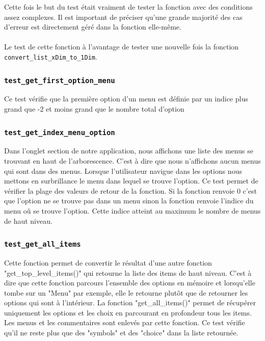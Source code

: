 \documentclass[16pts]{report}
\begin{document}
Cette fois le but du test était vraiment de tester la fonction avec des 
conditions assez complexes. Il est important de préciser qu'une grande 
majorité des cas d'erreur est directement géré dans la fonction elle-même.\\
\\

Le test de cette fonction à l'avantage de tester une nouvelle fois la 
fonction \verb|convert_list_xDim_to_1Dim|.\\

\subsubsection{\texttt{test\_get\_first\_option\_menu}}

Ce test vérifie que la première option d'un menu est définie par un indice
plus grand que -2 et moins grand que le nombre total d'option\\

\subsubsection{\texttt{test\_get\_index\_menu\_option}}

Dans l'onglet section de notre application, nous affichons une liste des 
menus se trouvant en haut de l'arborescence. C'est à dire que nous n'affichons 
aucun menus qui sont dans des menus. Lorsque l'utilisateur navigue dans les 
options nous mettons en surbrillance le menu dans lequel se trouve l'option. 
Ce test permet de vérifier la plage des valeurs de retour de la fonction. 
Si la fonction renvoie 0 c'est que l'option ne se trouve pas dans un menu 
sinon la fonction renvoie l'indice du menu oû se trouve l'option. Cette 
indice atteint au maximum le nombre de menus de haut niveau.

\subsubsection{\texttt{test\_get\_all\_items}}

Cette fonction permet de convertir le résultat d'une autre fonction 
"get\_top\_level\_items()" qui retourne la liste des items de haut niveau. 
C'est à dire que cette fonction parcours l'ensemble des options en mémoire 
et lorsqu'elle tombe sur un "Menu" par exemple, elle le retourne plutôt que 
de retourner les options qui sont à l'intérieur. La fonction 
"get\_all\_items()" permet de récupérer uniquement les options et les choix 
en parcourant en profondeur tous les items. Les menus et les commentaires 
sont enlevés par cette fonction. Ce test vérifie qu'il ne reste plus que 
des "symbols" et des "choice" dans la liste retournée.
\end{document}
